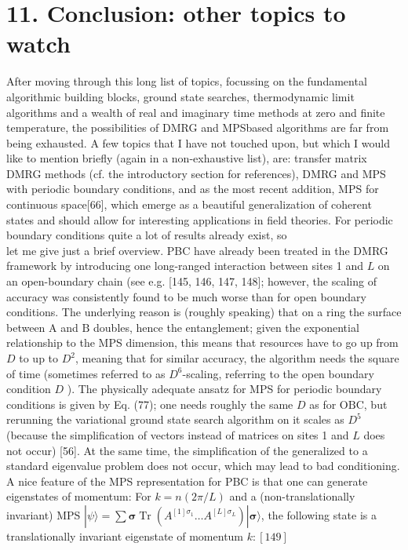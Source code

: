 \documentclass[12pt]{article}
\begin{document}
\section*{11. Conclusion: other topics to watch}
After moving through this long list of topics, focussing on the fundamental algorithmic building blocks, ground state searches, thermodynamic limit algorithms and a wealth of real and imaginary time methods at zero and finite temperature, the possibilities of DMRG and MPSbased algorithms are far from being exhausted. A few topics that I have not touched upon, but which I would like to mention briefly (again in a non-exhaustive list), are: transfer matrix DMRG methods (cf. the introductory section for references), DMRG and MPS with periodic boundary conditions, and as the most recent addition, MPS for continuous space[66], which emerge as a beautiful generalization of coherent states and should allow for interesting applications in field theories. For periodic boundary conditions quite a lot of results already exist, so\\
let me give just a brief overview. PBC have already been treated in the DMRG framework by introducing one long-ranged interaction between sites 1 and $L$ on an open-boundary chain (see e.g. [145, 146, 147, 148]; however, the scaling of accuracy was consistently found to be much worse than for open boundary conditions. The underlying reason is (roughly speaking) that on a ring the surface between $\mathrm{A}$ and $\mathrm{B}$ doubles, hence the entanglement; given the exponential relationship to the MPS dimension, this means that resources have to go up from $D$ to up to $D^{2}$, meaning that for similar accuracy, the algorithm needs the square of time (sometimes referred to as $D^{6}$-scaling, referring to the open boundary condition $D$ ). The physically adequate ansatz for MPS for periodic boundary conditions is given by Eq. (77); one needs roughly the same $D$ as for $\mathrm{OBC}$, but rerunning the variational ground state search algorithm on it scales as $D^{5}$ (because the simplification of vectors instead of matrices on sites 1 and $L$ does not occur) [56]. At the same time, the simplification of the generalized to a standard eigenvalue problem does not occur, which may lead to bad conditioning. A nice feature of the MPS representation for PBC is that one can generate eigenstates of momentum: For $k=n(2 \pi / L)$ and a (non-translationally invariant) MPS $|\psi\rangle=\sum \boldsymbol{\sigma} \operatorname{Tr}\left(A^{[1] \sigma_{1}} \ldots A^{[L] \sigma_{L}}\right)|\boldsymbol{\sigma}\rangle$, the following state is a translationally invariant eigenstate of momentum $k:[149]$
\end{document}
